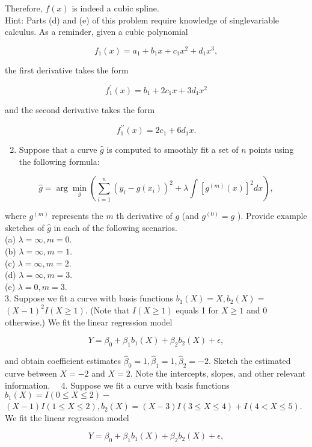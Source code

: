 \documentclass[10pt]{article}
\begin{document}
Therefore, $f(x)$ is indeed a cubic spline.\\
Hint: Parts (d) and (e) of this problem require knowledge of singlevariable calculus. As a reminder, given a cubic polynomial

$$
f_{1}(x)=a_{1}+b_{1} x+c_{1} x^{2}+d_{1} x^{3},
$$

the first derivative takes the form

$$
f_{1}^{\prime}(x)=b_{1}+2 c_{1} x+3 d_{1} x^{2}
$$

and the second derivative takes the form

$$
f_{1}^{\prime \prime}(x)=2 c_{1}+6 d_{1} x .
$$

\begin{enumerate}
  \setcounter{enumi}{1}
  \item Suppose that a curve $\hat{g}$ is computed to smoothly fit a set of $n$ points using the following formula:
\end{enumerate}

$$
\hat{g}=\arg \min _{g}\left(\sum_{i=1}^{n}\left(y_{i}-g\left(x_{i}\right)\right)^{2}+\lambda \int\left[g^{(m)}(x)\right]^{2} d x\right),
$$

where $g^{(m)}$ represents the $m$ th derivative of $g$ (and $g^{(0)}=g$ ). Provide example sketches of $\hat{g}$ in each of the following scenarios.\\
(a) $\lambda=\infty, m=0$.\\
(b) $\lambda=\infty, m=1$.\\
(c) $\lambda=\infty, m=2$.\\
(d) $\lambda=\infty, m=3$.\\
(e) $\lambda=0, m=3$.\\
3. Suppose we fit a curve with basis functions $b_{1}(X)=X, b_{2}(X)=$ $(X-1)^{2} I(X \geq 1)$. (Note that $I(X \geq 1)$ equals 1 for $X \geq 1$ and 0 otherwise.) We fit the linear regression model

$$
Y=\beta_{0}+\beta_{1} b_{1}(X)+\beta_{2} b_{2}(X)+\epsilon,
$$

and obtain coefficient estimates $\hat{\beta}_{0}=1, \hat{\beta}_{1}=1, \hat{\beta}_{2}=-2$. Sketch the estimated curve between $X=-2$ and $X=2$. Note the intercepts, slopes, and other relevant information.\
\
4. Suppose we fit a curve with basis functions $b_{1}(X)=I(0 \leq X \leq 2)-$ $(X-1) I(1 \leq X \leq 2), b_{2}(X)=(X-3) I(3 \leq X \leq 4)+I(4<X \leq 5)$. We fit the linear regression model

$$
Y=\beta_{0}+\beta_{1} b_{1}(X)+\beta_{2} b_{2}(X)+\epsilon,
$$
\end{document}
